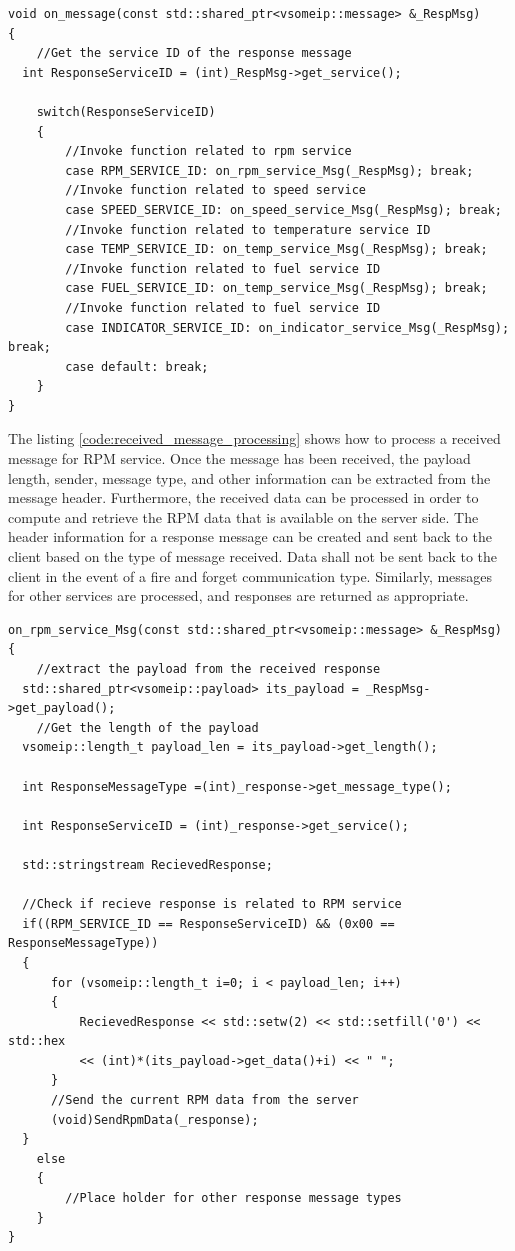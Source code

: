 \begin{lstlisting}[caption={vsomeip message handler callback}, label=code:register_message_callback]
void on_message(const std::shared_ptr<vsomeip::message> &_RespMsg)
{
	//Get the service ID of the response message
  int ResponseServiceID = (int)_RespMsg->get_service();

	switch(ResponseServiceID)
	{
		//Invoke function related to rpm service
		case RPM_SERVICE_ID: on_rpm_service_Msg(_RespMsg); break;
		//Invoke function related to speed service
		case SPEED_SERVICE_ID: on_speed_service_Msg(_RespMsg); break;
		//Invoke function related to temperature service ID
		case TEMP_SERVICE_ID: on_temp_service_Msg(_RespMsg); break;
		//Invoke function related to fuel service ID
		case FUEL_SERVICE_ID: on_temp_service_Msg(_RespMsg); break;
		//Invoke function related to fuel service ID
		case INDICATOR_SERVICE_ID: on_indicator_service_Msg(_RespMsg); break;
		case default: break;
	}
}
\end{lstlisting}

The listing \ref{code:received_message_processing} shows how to process a received message for RPM service. Once the message has been received, the payload length, sender, message type, and other information can be extracted from the message header. Furthermore, the received data can be processed in order to compute and retrieve the RPM data that is available on the server side. The header information for a response message can be created and sent back to the client based on the type of message received. Data shall not be sent back to the client in the event of a fire and forget communication type. Similarly, messages for other services are processed, and responses are returned as appropriate.

\begin{lstlisting}[caption={Example of received message processing}, label=code:received_message_processing]
on_rpm_service_Msg(const std::shared_ptr<vsomeip::message> &_RespMsg)
{
	//extract the payload from the received response
  std::shared_ptr<vsomeip::payload> its_payload = _RespMsg->get_payload();
	//Get the length of the payload
  vsomeip::length_t payload_len = its_payload->get_length();

  int ResponseMessageType =(int)_response->get_message_type();

  int ResponseServiceID = (int)_response->get_service();

  std::stringstream RecievedResponse;

  //Check if recieve response is related to RPM service
  if((RPM_SERVICE_ID == ResponseServiceID) && (0x00 == ResponseMessageType))
  {
      for (vsomeip::length_t i=0; i < payload_len; i++)
      {
          RecievedResponse << std::setw(2) << std::setfill('0') << std::hex
          << (int)*(its_payload->get_data()+i) << " ";
      }
      //Send the current RPM data from the server
      (void)SendRpmData(_response);
  }
	else
	{
		//Place holder for other response message types
	}
}
\end{lstlisting}


